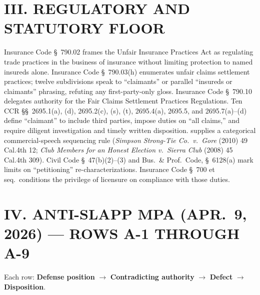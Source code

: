 \section*{III. REGULATORY AND STATUTORY FLOOR}

Insurance Code \S~790.02 frames the Unfair Insurance Practices Act as regulating trade practices in the business of insurance without limiting protection to named insureds alone. Insurance Code \S~790.03(h) enumerates unfair claims settlement practices; twelve subdivisions speak to ``claimants'' or parallel ``insureds or claimants'' phrasing, refuting any first-party-only gloss. Insurance Code \S~790.10 delegates authority for the Fair Claims Settlement Practices Regulations. Ten CCR \S\S~2695.1(a), (d), 2695.2(c), (s), (t), 2695.4(a), 2695.5, and 2695.7(a)--(d) define ``claimant'' to include third parties, impose duties on ``all claims,'' and require diligent investigation and timely written disposition.  supplies a categorical commercial-speech sequencing rule (\textit{Simpson Strong-Tie Co.\ v.\ Gore} (2010) 49 Cal.4th 12; \textit{Club Members for an Honest Election v.\ Sierra Club} (2008) 45 Cal.4th 309). Civil Code \S~47(b)(2)--(3) and Bus.\ \& Prof.\ Code, \S~6128(a) mark limits on ``petitioning'' re-characterizations. Insurance Code \S~700 et seq.\ conditions the privilege of licensure on compliance with those duties.

\section*{IV. ANTI-SLAPP MPA (APR.\ 9, 2026) --- ROWS A-1 THROUGH A-9}

Each row: \textbf{Defense position} $\rightarrow$ \textbf{Contradicting authority} $\rightarrow$ \textbf{Defect} $\rightarrow$ \textbf{Disposition}.

